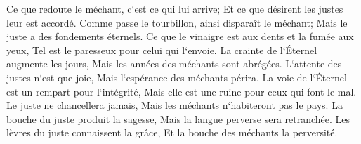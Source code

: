 \verse Ce que redoute le méchant, c`est ce qui lui arrive; Et ce que désirent les justes leur est accordé. 
\verse Comme passe le tourbillon, ainsi disparaît le méchant; Mais le juste a des fondements éternels. 
\verse Ce que le vinaigre est aux dents et la fumée aux yeux, Tel est le paresseux pour celui qui l`envoie. 
\verse La crainte de l`Éternel augmente les jours, Mais les années des méchants sont abrégées. 
\verse L`attente des justes n`est que joie, Mais l`espérance des méchants périra. 
\verse La voie de l`Éternel est un rempart pour l`intégrité, Mais elle est une ruine pour ceux qui font le mal. 
\verse Le juste ne chancellera jamais, Mais les méchants n`habiteront pas le pays. 
\verse La bouche du juste produit la sagesse, Mais la langue perverse sera retranchée. 
\verse Les lèvres du juste connaissent la grâce, Et la bouche des méchants la perversité. 

\chapter{}

